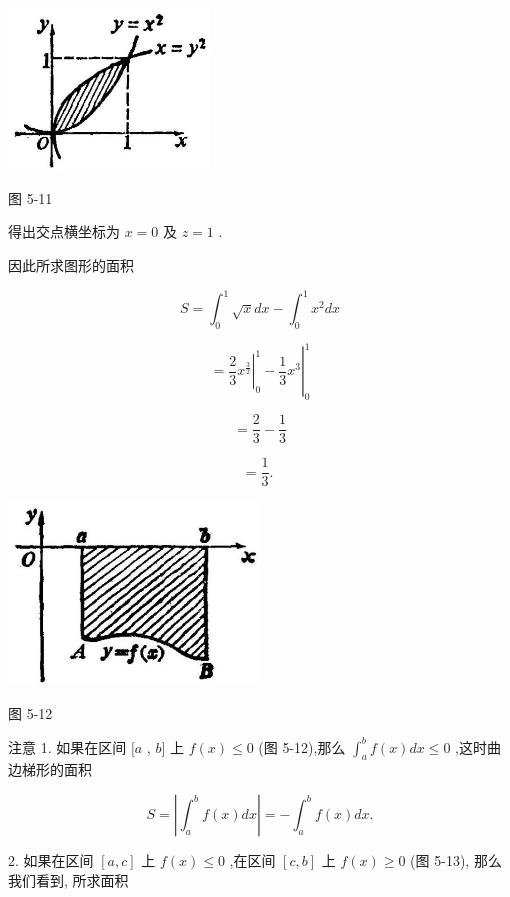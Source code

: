 \documentclass[10pt]{article}
\begin{document}
\begin{center}
\includegraphics[max width=0.4\textwidth]{images/01912c18-5c3f-733d-b775-749ba9897a9d_234_594804.jpg}
\end{center}

图 5-11

得出交点横坐标为 \(x = 0\) 及 \(z = 1\) .

因此所求图形的面积

\[
S = {\int }_{0}^{1}\sqrt{x}{dx} - {\int }_{0}^{1}{x}^{2}{dx}
\]

\[
= {\left. {\left. \frac{2}{3}{x}^{\frac{3}{2}}\right| }_{0}^{1} - \frac{1}{3}{x}^{3}\right| }_{0}^{1}
\]

\[
= \frac{2}{3} - \frac{1}{3}
\]

\[
= \frac{1}{3}\text{. }
\]

\begin{center}
\includegraphics[max width=0.5\textwidth]{images/01912c18-5c3f-733d-b775-749ba9897a9d_234_549966.jpg}
\end{center}

图 5-12

注意 1. 如果在区间 \(\lbrack a\) , \(b\rbrack\) 上 \(f\left( x\right) \leq 0\) (图 5-12),那么 \({\int }_{a}^{b}f\left( x\right) {dx} \leq 0\) ,这时曲边梯形的面积

\[
S = \left| {{\int }_{a}^{b}f\left( x\right) {dx}}\right| = - {\int }_{a}^{b}f\left( x\right) {dx}.
\]

2. 如果在区间 \(\left\lbrack {a,c}\right\rbrack\) 上 \(f\left( x\right) \leq 0\) ,在区间 \(\left\lbrack {c,b}\right\rbrack\) 上 \(f\left( x\right) \geq 0\) (图 5-13), 那么我们看到, 所求面积
\end{document}

